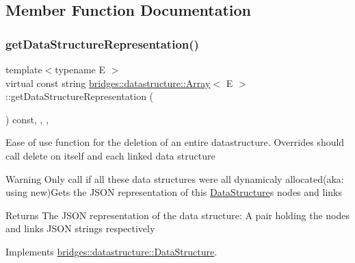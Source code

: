 \subsection{Member Function Documentation}
\mbox{\label{classbridges_1_1datastructure_1_1_array_a210de6729fa08715c13d2deb0b141010}} 
\subsubsection{\texorpdfstring{getDataStructureRepresentation()}{getDataStructureRepresentation()}}
{\footnotesize\ttfamily template$<$typename E $>$ \\
virtual const string \mbox{\hyperlink{classbridges_1_1datastructure_1_1_array}{bridges\+::datastructure\+::\+Array}}$<$ E $>$\+::get\+Data\+Structure\+Representation (\begin{DoxyParamCaption}{ }\end{DoxyParamCaption}) const\hspace{0.3cm}{\ttfamily [inline]}, {\ttfamily [final]}, {\ttfamily [override]}, {\ttfamily [virtual]}}

Ease of use function for the deletion of an entire datastructure. Overrides should call delete on itself and each linked data structure

\begin{DoxyWarning}{Warning}
Only call if all these data structures were all dynamicaly allocated(aka\+: using new)Gets the J\+S\+ON representation of this \mbox{\hyperlink{classbridges_1_1datastructure_1_1_data_structure}{Data\+Structure}}\textquotesingle{}s nodes and links
\end{DoxyWarning}
\begin{DoxyReturn}{Returns}
The J\+S\+ON representation of the data structure\+: A pair holding the nodes and links J\+S\+ON strings respectively 
\end{DoxyReturn}


Implements \mbox{\hyperlink{classbridges_1_1datastructure_1_1_data_structure}{bridges\+::datastructure\+::\+Data\+Structure}}.

\mbox{\label{classbridges_1_1datastructure_1_1_array_aa2a14939c8e53087e833ebf71822a057}} 
